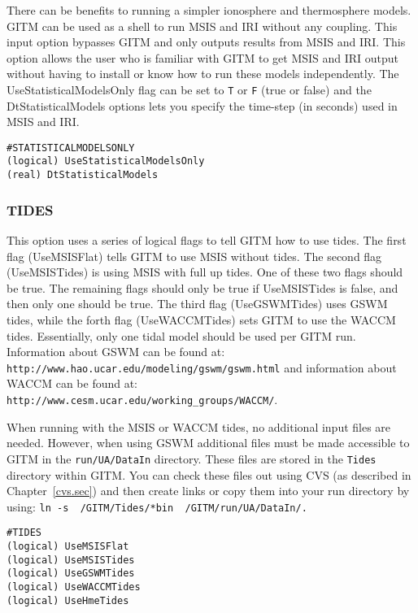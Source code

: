 There can be benefits to running a simpler ionosphere and thermosphere models.  GITM can be used as a shell to run MSIS and IRI without any coupling.  This input option bypasses GITM and only outputs results from MSIS and IRI.  This option allows the user who is familiar with GITM to get MSIS and IRI output without having to install or know how to run these models independently.  The UseStatisticalModelsOnly flag can be set to {\tt T} or {\tt F} (true or false) and the DtStatisticalModels options lets you specify the time-step (in seconds) used in MSIS and IRI.

\begin{verbatim}
#STATISTICALMODELSONLY
(logical) UseStatisticalModelsOnly
(real) DtStatisticalModels
\end{verbatim}

\subsubsection{TIDES}
\label{tides}

This option uses a series of logical flags to tell GITM how to use tides.   The first flag (UseMSISFlat) tells GITM to use MSIS without tides.  The second flag (UseMSISTides) is using MSIS with full up tides. One of these two flags should be true.  The remaining flags should only be true if UseMSISTides is false, and then only one should be true.  The third flag (UseGSWMTides) uses GSWM tides, while the forth flag (UseWACCMTides) sets GITM to use the WACCM tides.  Essentially, only one tidal model should be used per GITM run.  Information about GSWM can be found at: \\{\tt http://www.hao.ucar.edu/modeling/gswm/gswm.html} and information about WACCM can be found at: \\{\tt http://www.cesm.ucar.edu/working\_groups/WACCM/}.

When running with the MSIS or WACCM tides, no additional input files are needed.  However, when using GSWM additional files must be made accessible to GITM in the {\tt run/UA/DataIn} directory.  These files are stored in the {\tt Tides} directory within GITM.  You can check these files out using CVS (as described in Chapter~\ref{cvs.sec}) and then create links or copy them into your run directory by using: {\tt ln -s ~/GITM/Tides/*bin ~/GITM/run/UA/DataIn/.}

\begin{verbatim}
#TIDES
(logical) UseMSISFlat      
(logical) UseMSISTides      
(logical) UseGSWMTides     
(logical) UseWACCMTides    
(logical) UseHmeTides
\end{verbatim}

